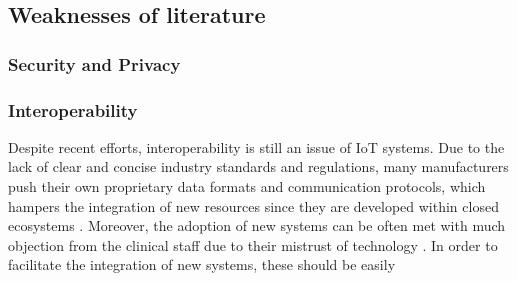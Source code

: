 %

\subsection{Weaknesses of literature}

\subsubsection{Security and Privacy}


\subsubsection{Interoperability}

Despite recent efforts, interoperability is still an issue of IoT systems. Due to the lack of clear and concise industry standards and regulations, many manufacturers push their own proprietary data formats and communication protocols, which hampers the integration of new resources since they are developed within closed ecosystems \cite{Rubi2019}. 
Moreover, the adoption of new systems can be often met with much objection from the clinical staff due to their mistrust of technology \cite{DursunErgezen2020}. 
In order to facilitate the integration of new systems, these should be easily 



